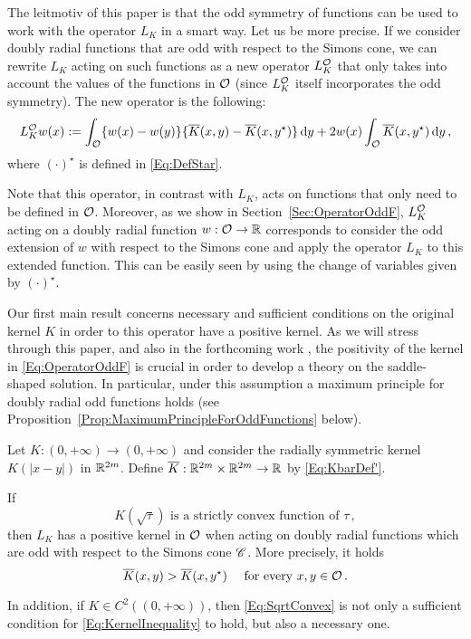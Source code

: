 The leitmotiv of this paper is that the odd symmetry of functions can be used to work with the operator $L_K$ in a smart way. Let us be more precise. If we consider doubly radial functions that are odd with respect to the Simons cone, we can rewrite $L_K$ acting on such functions as a new operator $L_K^{\mathcal{O}}$ that only takes into account the values of the functions in $\mathcal{O}$ (since $L_K^{\mathcal{O}}$ itself incorporates the odd symmetry). The new operator is the following:
\begin{equation}
\label{Eq:OperatorOddF}
L_K^{\mathcal{O}} w (x) := \int_{\mathcal{O}} \{w(x) - w(y) \} \{\overline{K}(x, y) - \overline{K}(x, y^\star)  \} \,\mathrm{d} y +  2 w(x) \int_{\mathcal{O}} \overline{K}(x, y^\star) \,\mathrm{d} y \,,
\end{equation}
where $(\cdot)^\star$ is defined in \eqref{Eq:DefStar}.

Note that this operator, in contrast with $L_K$, acts on functions that only need to be defined in $\mathcal{O}$. Moreover, as we show in Section~\ref{Sec:OperatorOddF}, $L_K^{\mathcal{O}}$ acting on a doubly radial function $w:\mathcal{O} \to \mathbb{R}$ corresponds to consider the odd extension of $w$ with respect to the Simons cone and apply the operator $L_K$ to this extended function. This can be easily seen by using the change of variables given by $(\cdot)^\star$.

Our first main result concerns necessary and sufficient conditions on the original kernel $K$ in order to this operator have a positive kernel.  As we will stress through this paper, and also in the forthcoming work \cite{FelipeSanz-Perela:IntegroDifferentialII}, the positivity of the kernel in \eqref{Eq:OperatorOddF} is crucial in order to develop a theory on the saddle-shaped solution. In particular, under this assumption a maximum principle for doubly radial odd functions holds (see Proposition~\ref{Prop:MaximumPrincipleForOddFunctions} below).

\begin{theorem}
	\label{Th:SufficientNecessaryConditions}
	Let $K:(0,+\infty) \to (0,+\infty)$ and consider the radially symmetric kernel $K(|x-y|)$ in $\mathbb{R}^{2m}$. Define $\overline{K} : \mathbb{R}^{2m}\times \mathbb{R}^{2m} \to \mathbb{R}$ by \eqref{Eq:KbarDef'}.
	
	If 
	\begin{equation}
	\label{Eq:SqrtConvex}	
	K(\sqrt{\tau}) \text{ is a strictly convex function of }\tau\,,
	\end{equation}
	then $L_K$ has a positive kernel in $\mathcal{O}$ when acting on doubly radial functions which are odd with respect to the Simons cone $\mathscr{C}$. More precisely, it holds
	\begin{equation}
	\label{Eq:KernelInequality}
	\overline{K}(x,y) > \overline{K}(x, y^\star) \quad \text{ for every }x,y \in \mathcal{O}\,.
	\end{equation}
	
	In addition, if $K\in C^2((0,+\infty))$, then \eqref{Eq:SqrtConvex} is not only a sufficient condition for \eqref{Eq:KernelInequality} to hold, but also a necessary one.
\end{theorem}

